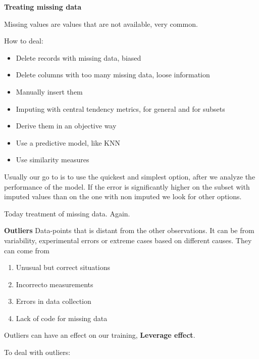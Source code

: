 \vspace{10pt}

\textbf{Treating missing data}

\vspace{10pt}

Missing values are values that are not available, very common. 

How to deal:
\begin{itemize}
    \item Delete records with missing data, biased
    \item Delete columns with too many missing data, loose information
    \item Manually insert them
    \item Imputing with central tendency metrics, for general and for subsets
    \item Derive them in an objective way
    \item Use a predictive model, like KNN
    \item Use similarity measures
\end{itemize}

\vspace{10pt}

Usually our go to is to use the quickest and simplest option, after we analyze the performance of the model.
If the error is significantly higher on the subset with imputed values than on the one with non imputed we look for other options.



Today treatment of missing data. Again.

\vspace{10pt}

\textbf{Outliers} \ra Data-points that is distant from the other observations.
It can be from variability, experimental errors or extreme cases based on different causes. 
They can come from
\begin{enumerate}
    \item Unusual but correct situations
    \item Incorrecto measurements
    \item Errors in data collection
    \item Lack of code for missing data
\end{enumerate}

Outliers can have an effect on our training, \textbf{Leverage effect}.



To deal with outliers:


